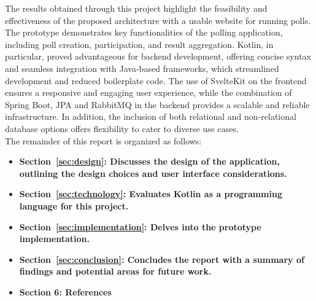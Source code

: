 The results obtained through this project highlight the feasibility and effectiveness of the proposed architecture with a usable website for running polls.
The prototype demonstrates key functionalities of the polling application, including poll creation, participation, and result aggregation.
Kotlin, in particular, proved advantageous for backend development, offering concise syntax and seamless integration with Java-based frameworks, which streamlined development and reduced boilerplate code.
The use of SvelteKit on the frontend ensures a responsive and engaging user experience, while the combination of Spring Boot, JPA and RabbitMQ in the backend provides a scalable and reliable infrastructure.
In addition, the inclusion of both relational and non-relational database options offers flexibility to cater to diverse use cases. \\

The remainder of this report is organized as follows:
\begin{itemize}
    \item \textbf{Section~\ref{sec:design}: Discusses the design of the application, outlining the design choices and user interface considerations.}
    \item \textbf{Section~\ref{sec:technology}: Evaluates Kotlin as a programming language for this project.}
    \item \textbf{Section~\ref{sec:implementation}: Delves into the prototype implementation.}
    \item \textbf{Section~\ref{sec:conclusion}: Concludes the report with a summary of findings and potential areas for future work.}
    \item \textbf{Section 6: References}
\end{itemize}
